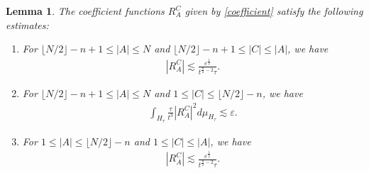 \documentclass{article}
\newtheorem{lemma}{Lemma}[section]
\begin{document}
%
\begin{lemma} \label{lem R}
The coefficient functions $ R^C_A $ given by \eqref{coefficient} satisfy the following estimates:
\begin{enumerate}
\item[$ ( i ) $] For $ \lfloor N / 2 \rfloor - n + 1 \leq | A | \leq N $ and $ \lfloor N / 2 \rfloor - n + 1 \leq | C | \leq | A | $, we have
\begin{align*}
| R^C_A | \lesssim \frac{ \varepsilon^\frac{ 1 }{2 } }{ t^{ \frac{ n }{ 2 } - 2 } \tau } .
\end{align*}
\item[$ ( ii ) $] For $ \lfloor N / 2 \rfloor - n + 1 \leq | A | \leq N $ and $ 1 \leq | C | \leq \lfloor N / 2 \rfloor - n $, we have
\begin{align*}
\int_{ H_\tau } \frac{ \tau }{ t^3 } | R^C_A |^2 d \mu_{ H_\tau } \lesssim \varepsilon .
\end{align*}
\item[$ ( iii ) $] For $ 1 \leq | A | \leq \lfloor N / 2 \rfloor - n $ and $ 1 \leq | C | \leq | A | $, we have
\begin{align*}
| R^C_A | \lesssim \frac{ \varepsilon^\frac{ 1 }{ 2 } }{ t^{ \frac{ n }{ 2 } - 2 } \tau } .
\end{align*}
\end{enumerate}
\end{lemma}
%
\end{document}
